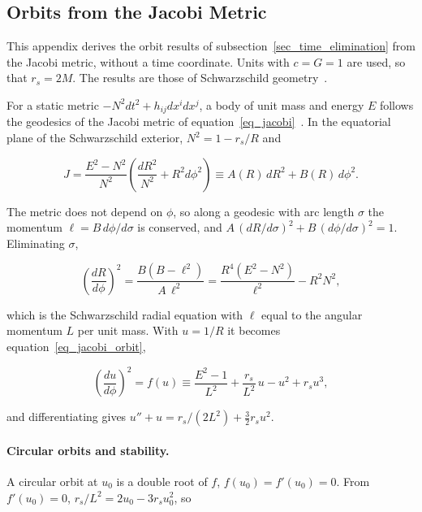 \documentclass[anonymous]{iopjournal}
\begin{document}
\begin{appendices}

\section{Orbits from the Jacobi Metric}\label{app_orbits}

This appendix derives the orbit results of subsection~\ref{sec_time_elimination} from the Jacobi metric, without a time coordinate. Units with $c=G=1$ are used, so that $r_s=2M$. The results are those of Schwarzschild geometry~\cite{MTW1973}.

For a static metric $-N^2dt^2+h_{ij}dx^idx^j$, a body of unit mass and energy $E$ follows the geodesics of the Jacobi metric of equation~\eqref{eq_jacobi}~\cite{Gibbons2016Jacobi}. In the equatorial plane of the Schwarzschild exterior, $N^2=1-r_s/R$ and

\begin{equation}
    J=\frac{E^2-N^2}{N^2}\left(\frac{dR^2}{N^2}+R^2d\phi^2\right)\equiv A(R)\,dR^2+B(R)\,d\phi^2 .
\end{equation}

The metric does not depend on $\phi$, so along a geodesic with arc length $\sigma$ the momentum $\ell=B\,d\phi/d\sigma$ is conserved, and $A\,(dR/d\sigma)^2+B\,(d\phi/d\sigma)^2=1$. Eliminating $\sigma$,

\begin{equation}
    \left(\frac{dR}{d\phi}\right)^2=\frac{B\left(B-\ell^2\right)}{A\,\ell^2}=\frac{R^4\left(E^2-N^2\right)}{\ell^2}-R^2N^2 ,
\end{equation}

which is the Schwarzschild radial equation with $\ell$ equal to the angular momentum $L$ per unit mass. With $u=1/R$ it becomes equation~\eqref{eq_jacobi_orbit},

\begin{equation}\label{eq_app_orbit_u}
    \left(\frac{du}{d\phi}\right)^2=f(u)\equiv\frac{E^2-1}{L^2}+\frac{r_s}{L^2}\,u-u^2+r_su^3 ,
\end{equation}

and differentiating gives $u''+u=r_s/(2L^2)+\tfrac32r_su^2$.

\paragraph{Circular orbits and stability.} A circular orbit at $u_0$ is a double root of $f$, $f(u_0)=f'(u_0)=0$. From $f'(u_0)=0$, $r_s/L^2=2u_0-3r_su_0^2$, so


\end{appendices}
\end{document}
